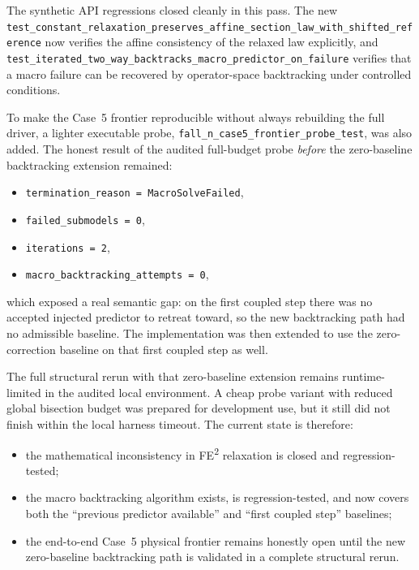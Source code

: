 The synthetic API regressions closed cleanly in this pass.  The new
\texttt{test\_constant\_relaxation\_preserves\_affine\_section\_law\_with\_shifted\_reference}
now verifies the affine consistency of the relaxed law explicitly, and
\texttt{test\_iterated\_two\_way\_backtracks\_macro\_predictor\_on\_failure}
verifies that a macro failure can be recovered by operator-space backtracking
under controlled conditions.

To make the Case~5 frontier reproducible without always rebuilding the full
driver, a lighter executable probe,
\texttt{fall\_n\_case5\_frontier\_probe\_test}, was also added.  The honest
result of the audited full-budget probe \emph{before} the zero-baseline
backtracking extension remained:
\begin{itemize}
  \item \texttt{termination\_reason = MacroSolveFailed},
  \item \texttt{failed\_submodels = 0},
  \item \texttt{iterations = 2},
  \item \texttt{macro\_backtracking\_attempts = 0},
\end{itemize}
which exposed a real semantic gap: on the first coupled step there was no
accepted injected predictor to retreat toward, so the new backtracking path
had no admissible baseline.  The implementation was then extended to use the
zero-correction baseline on that first coupled step as well.

The full structural rerun with that zero-baseline extension remains
runtime-limited in the audited local environment.  A cheap probe variant with
reduced global bisection budget was prepared for development use, but it still
did not finish within the local harness timeout.  The current state is
therefore:
\begin{itemize}
  \item the mathematical inconsistency in FE\textsuperscript{2} relaxation is
    closed and regression-tested;
  \item the macro backtracking algorithm exists, is regression-tested, and now
    covers both the ``previous predictor available'' and ``first coupled
    step'' baselines;
  \item the end-to-end Case~5 physical frontier remains honestly open until the
    new zero-baseline backtracking path is validated in a complete structural
    rerun.
\end{itemize}

